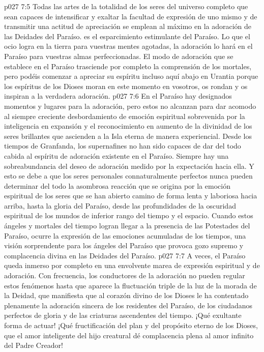 \vs p027 7:5 Todas las artes de la totalidad de los seres del universo completo que sean capaces de intensificar y exaltar la facultad de expresión de uno mismo y de transmitir una actitud de apreciación se emplean al máximo en la adoración de las Deidades del Paraíso.  es el esparcimiento estimulante del Paraíso. Lo que el ocio logra en la tierra para vuestras mentes agotadas, la adoración lo hará en el Paraíso para vuestras almas perfeccionadas. El modo de adoración que se establece en el Paraíso trasciende por completo la comprensión de los mortales, pero podéis comenzar a apreciar su espíritu incluso aquí abajo en Urantia porque los espíritus de los Dioses moran en este momento en vosotros, os rondan y os inspiran a la verdadera adoración.
\vs p027 7:6 En el Paraíso hay designados momentos y lugares para la adoración, pero estos no alcanzan para dar acomodo al siempre creciente desbordamiento de emoción espiritual sobrevenida por la inteligencia en expansión y el reconocimiento en aumento de la divinidad de los seres brillantes que ascienden a la Isla eterna de manera experiencial. Desde los tiempos de Granfanda, los supernafines no han sido capaces de dar del todo cabida al espíritu de adoración existente en el Paraíso. Siempre hay una sobreabundancia del deseo de adoración medido por la expectación hacia ella. Y esto se debe a que los seres personales connaturalmente perfectos nunca pueden determinar del todo la asombrosa reacción que se origina por la emoción espiritual de los seres que se han abierto camino de forma lenta y laboriosa hacia arriba, hasta la gloria del Paraíso, desde las profundidades de la oscuridad espiritual de los mundos de inferior rango del tiempo y el espacio. Cuando estos ángeles y mortales del tiempo logran llegar a la presencia de las Potestades del Paraíso, ocurre la expresión de las emociones acumuladas de los tiempos, una visión sorprendente para los ángeles del Paraíso que provoca gozo supremo y complacencia divina en las Deidades del Paraíso.
\vs p027 7:7 A veces, el Paraíso queda inmerso por completo en una envolvente marea de expresión espiritual y de adoración. Con frecuencia, los conductores de la adoración no pueden regular estos fenómenos hasta que aparece la fluctuación triple de la luz de la morada de la Deidad, que manifiesta que al corazón divino de los Dioses le ha contentado plenamente la adoración sincera de los residentes del Paraíso, de los ciudadanos perfectos de gloria y de las criaturas ascendentes del tiempo. ¡Qué exultante forma de actuar! ¡Qué fructificación del plan y del propósito eterno de los Dioses, que el amor inteligente del hijo creatural dé complacencia plena al amor infinito del Padre Creador!
